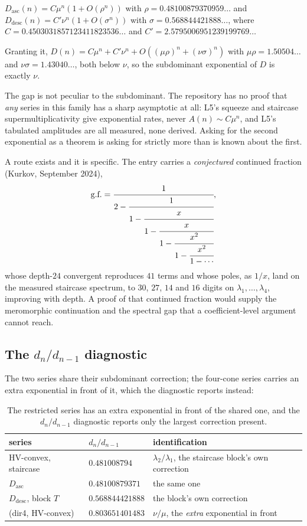 \documentclass[11pt]{article}
\begin{document}
\begin{conjecture}
\label{conj:sharp}
$D_{\mathrm{asc}}(n) = C\mu^n(1 + O(\rho^n))$ with $\rho = 0.48100879370959\dots$
and $D_{\mathrm{desc}}(n) = C'\nu^n(1 + O(\sigma^n))$ with
$\sigma = 0.568844421888\dots$, where $C = 0.4503031857123411823536\dots$ and
$C' = 2.5795006951239199769\dots$
\end{conjecture}

Granting it, $D(n) = C\mu^n + C'\nu^n + O((\mu\rho)^n + (\nu\sigma)^n)$ with
$\mu\rho = 1.50504\dots$ and $\nu\sigma = 1.43040\dots$, both below $\nu$, so the
subdominant exponential of $D$ is exactly $\nu$.

The gap is not peculiar to the subdominant. The repository has no proof that
\emph{any} series in this family has a sharp asymptotic at all:
L5's squeeze and staircase supermultiplicativity give exponential
rates, never $A(n) \sim C\mu^n$, and L5's tabulated amplitudes are all measured, none derived. Asking for the second
exponential as a theorem is asking for strictly more than is known about the
first.

A route exists and it is specific. The  entry carries a
\emph{conjectured} continued fraction (Kurkov, September 2024),
\[
  \text{g.f.} = \cfrac{1}{2 - \cfrac{1}{1 - \cfrac{x}{1 - \cfrac{x}{1 - \cfrac{x^2}{1 - \cfrac{x^2}{1 - \cdots}}}}}},
\]
whose depth-$24$ convergent reproduces $41$ terms and whose poles, as $1/x$,
land on the measured staircase spectrum, to $30$, $27$, $14$ and $16$ digits on
$\lambda_1,\dots,\lambda_4$, improving with depth. A proof of that continued
fraction would supply the meromorphic continuation and the spectral gap that a
coefficient-level argument cannot reach.

\subsection{The \texorpdfstring{$d_n/d_{n-1}$}{d\_n/d\_\{n-1\}} diagnostic}

The two series share their subdominant correction; the four-cone series carries
an extra exponential in front of it, which the diagnostic reports instead:

\begin{table}[H]
\centering\small
\begin{tabular}{l l l}
\toprule
series & $d_n/d_{n-1}$ & identification \\
\midrule
HV-convex, staircase & $0.481008794$ & $\lambda_2/\lambda_1$, the staircase block's own correction \\
$D_{\mathrm{asc}}$ & $\mathbf{0.48100879371}$ & the same one \\
$D_{\mathrm{desc}}$, block $T$ & $0.568844421888$ & the block's own correction \\
(dir4, HV-convex) & $0.803651401483$ & $\nu/\mu$, the \emph{extra} exponential in front \\
\bottomrule
\end{tabular}
\caption{The restricted series has an extra exponential in front of the shared
one, and the $d_n/d_{n-1}$ diagnostic reports only the largest correction
present.}
\label{tab:tableB}
\end{table}
\end{document}
